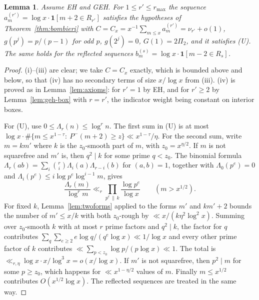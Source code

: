 \documentclass[11pt]{amsart}
\newtheorem{lemma}[theorem]{Lemma}
\theoremstyle{definition}
\theoremstyle{remark}
\begin{document}
\begin{lemma}\label{lem:roughseq}
Assume EH and GEH. For $1\le r'\le r_{\max}$ the sequence $a^{(r')}_m=\log x\cdot\mathbf 1[m+2\in R_{r'}]$ satisfies the hypotheses of Theorem~\ref{thm:bombieri} with $C=C_x=x^{-1}\sum_{m\le x}a^{(r')}_m=\nu_{r'}+o(1)$, $g(p^j)=p/(p-1)$ for odd $p$, $g(2^j)=0$, $G(1)=2\Pi_2$, and it satisfies (U). The same holds for the reflected sequences $b^{(s)}_m=\log x\cdot\mathbf 1[m-2\in R_s]$.
\end{lemma}
\begin{proof}
(i)--(iii) are clear; we take $C=C_x$ exactly, which is bounded above and below, so that (iv) has no secondary terms of size $x/\log x$ from (iii). (iv) is proved as in Lemma~\ref{lem:axioms}: for $r'=1$ by EH, and for $r'\ge2$ by Lemma~\ref{lem:geh-box} with $r=r'$, the indicator weight being constant on interior boxes.

For (U), use $0\le\Lambda_r(n)\le\log^rn$. The first sum in (U) is at most $\log x\cdot\#\{m\le x^{1-\tau}:\ P^-(m+2)\ge z\}\ll x^{1-\tau}/\eta$. For the second sum, write $m=km'$ where $k$ is the $z_0$-smooth part of $m$, with $z_0=x^{\eta/2}$. If $m$ is not squarefree and $m'$ is, then $q^2\mid k$ for some prime $q<z_0$. The binomial formula $\Lambda_r(ab)=\sum_i\binom ri\Lambda_i(a)\Lambda_{r-i}(b)$ for $(a,b)=1$, together with $\Lambda_0(p^e)=0$ and $\Lambda_i(p^e)\le i\log p^e\log^{i-1}m$, gives
\[
\frac{\Lambda_r(m)}{\log^rm}\ll_r\prod_{p^e\,\|\,k}\frac{\log p^e}{\log x}\qquad(m>x^{1/2}).
\]
For fixed $k$, Lemma~\ref{lem:twoforms} applied to the forms $m'$ and $km'+2$ bounds the number of $m'\le x/k$ with both $z_0$-rough by $\ll x/(k\eta^2\log^2x)$. Summing over $z_0$-smooth $k$ with at most $r$ prime factors and $q^2\mid k$, the factor for $q$ contributes $\sum_q\sum_{e\ge2}e\log q/(q^e\log x)\ll1/\log x$ and every other prime factor of $k$ contributes $\ll\sum_{p<z_0}\log p/(p\log x)\ll1$. The total is $\ll_{r,\eta}\log x\cdot x/\log^3x=o(x/\log x)$. If $m'$ is not squarefree, then $p^2\mid m$ for some $p\ge z_0$, which happens for $\ll x^{1-\eta/2}$ values of $m$. Finally $m\le x^{1/2}$ contributes $O(x^{1/2}\log x)$. The reflected sequences are treated in the same way.
\end{proof}
\end{document}
